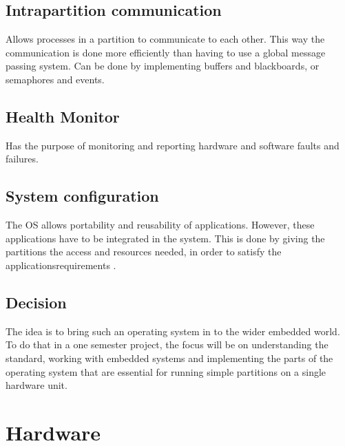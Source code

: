 \subsection{Intrapartition communication}
Allows processes in a partition to communicate to each other. This way
the communication is done more efficiently than having to use a 
global message passing system.
Can be done by implementing buffers and blackboards, or semaphores and 
events.

\subsection{Health Monitor}
Has the purpose of monitoring and reporting hardware and software faults
and failures.

\subsection{System configuration}
The OS allows portability and reusability of applications. However,
these applications have to be integrated in the system. This is done
by giving the partitions the access and resources needed, in order to
satisfy the applications\textquotesingle requirements \cite{page_42}.

\subsection{Decision}
The idea is to bring such an operating system in to the wider embedded world.
To do that in a one semester project, the focus will be on understanding the standard,
working with embedded systems and implementing the parts of the operating system that are
essential for running simple partitions on a single hardware unit.

\section{Hardware}

